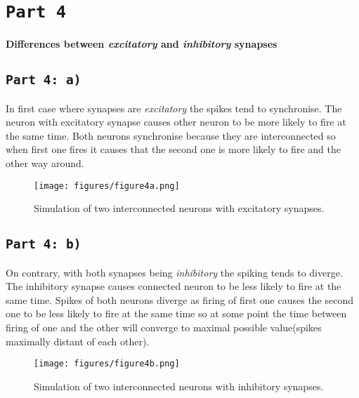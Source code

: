\documentclass[12pt,a4paper,twocolumn]{article}
\begin{document}
\section*{\texttt{Part 4}}
\textbf{\large Differences between \emph{excitatory} and \emph{inhibitory} synapses}

\subsection*{\texttt{Part 4: a)}}
In first case where synapses are \emph{excitatory} the spikes tend to synchronise. The neuron with excitatory synapse causes other neuron to be more likely to fire at the same time. Both neurons synchronise because they are interconnected so when first one fires it causes that the second one is more likely to fire and the other way around.\\

\begin{figure}[htbp]
\centering
\texttt{[image: figures/figure4a.png]}
\caption{Simulation of two interconnected neurons with excitatory synapses.\label{fig:part4a}}
\vspace{0.2cm}
\end{figure}

\subsection*{\texttt{Part 4: b)}}
On contrary, with both synapses being \emph{inhibitory} the spiking tends to diverge. The inhibitory synapse causes connected neuron to be less likely to fire at the same time. Spikes of both neurons diverge as firing of first one causes the second one to be less likely to fire at the same time so at some point the time between firing of one and the other will converge to maximal possible value(spikes maximally distant of each other).

\begin{figure}[htbp]
\centering
\texttt{[image: figures/figure4b.png]}
\caption{Simulation of two interconnected neurons with inhibitory synapses.\label{fig:part4b}}
\vspace{0.2cm}
\end{figure}
\end{document}
